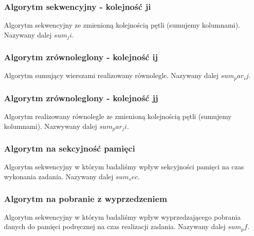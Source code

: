 \subsubsection{Algorytm sekwencyjny - kolejność ji}

Algorytm sekwencyjny ze zmienioną kolejnością pętli (sumujemy kolumnami). Nazywany dalej $sum_ji$.



\subsubsection{Algorytm zrównoleglony - kolejność ij}

Algorytm sumujący wierszami realizowany równolegle. Nazywany dalej $sum_par_ij$.



\subsubsection{Algorytm zrównoleglony - kolejność jj}

Algorytm realizowany równolegle ze zmienioną kolejnością pętli (sumujemy kolumnami). Nazwywany dalej $sum_par_ji$.



\subsubsection{Algorytm na sekcyjność pamięci}

Algorytm sekwencyjny w którym badaliśmy wpływ sekcyjności pamięci na czas wykonania zadania. Nazywany dalej $sum_sec$.



\subsubsection{Algorytm na  pobranie  z wyprzedzeniem}

Algorytm sekwencyjny w którym badaliśmy wpływ wyprzedzającego pobrania danych do pamięci podręcznej na czas realizacji zadania. Nazywany dalej $sum_pf$.


